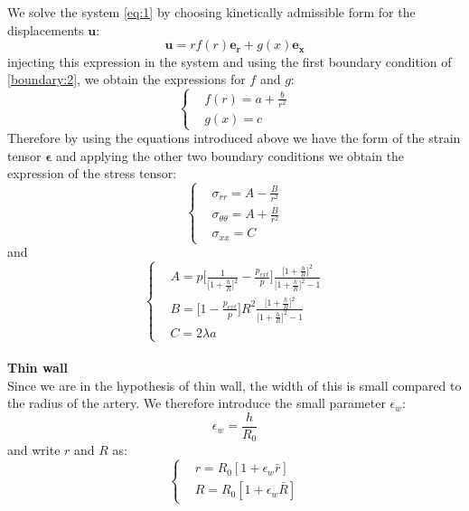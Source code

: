 \documentclass[12pt,a4paper]{article}
\numberwithin{equation}{section}
\begin{document}
We solve the system \ref{eq:1} by choosing kinetically admissible form for the displacements $\boldsymbol{u}$:
\begin{equation*}
\boldsymbol{u} = rf(r)\boldsymbol{e_r}+g(x)\boldsymbol{e_x}
\end{equation*}
injecting this expression in the system and using the first boundary condition of \ref{boundary:2}, we obtain the expressions for $f$ and $g$:
\begin{equation}
  \left\{
      \begin{aligned}
       & f(r) = a + \frac{b}{r^2} \\
       & g(x) = c
      \end{aligned}
    \right.
\end{equation}
Therefore by using the equations introduced above we have the form of the strain tensor $\boldsymbol{\epsilon}$ and applying the other two boundary conditions we obtain the expression of the stress tensor:
\begin{equation} \label{sigma:4}
  \left\{
      \begin{aligned}
       & \sigma_{rr} = A-\frac{B}{r^2} \\
       & \sigma_{\theta\theta} = A+\frac{B}{r^2} \\
       & \sigma_{xx} = C
      \end{aligned}
    \right.
\end{equation}
and
\begin{equation} \label{sigma:4}
  \left\{
      \begin{aligned}
       & A = p \Bigg[\frac{1}{\big[1+\frac{h}{R}\big]^2} - \frac{p_{ext}}{p}\Bigg] \frac{\big[1+\frac{h}{R}\big]^2}{\big[1+\frac{h}{R}\big]^2 -1} \\
       & B = \Big[1- \frac{p_{ext}}{p}\Big]R^2 \frac{\big[1+\frac{h}{R}\big]^2}{\big[1+\frac{h}{R}\big]^2 -1}\\
       & C = 2\lambda a
      \end{aligned}
    \right.
\end{equation}
\\
{\bf Thin wall}\\
Since we are in the hypothesis of thin wall, the width of this is small compared to the radius of the artery. We therefore introduce the small parameter $\epsilon_w$:
\begin{equation*}
	\epsilon_w = \frac{h}{R_0}
\end{equation*}
and write $r$ and $R$ as:
\begin{equation}
  \left\{
      \begin{aligned}
       & r = R_0[1+\epsilon_w\bar{r}] \\
       & R = R_0[1+\epsilon_w\bar{R}]
      \end{aligned}
    \right.
\end{equation}
\end{document}
